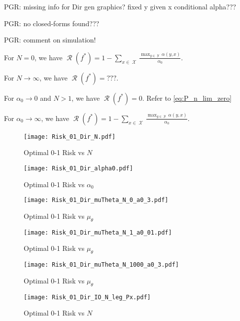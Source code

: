 \documentclass[12pt]{report}
\DeclareMathOperator{\Xcal}{\mathcal{X}}
\DeclareMathOperator{\Ycal}{\mathcal{Y}}
\DeclareMathOperator{\Rcal}{\mathcal{R}}
\begin{document}
PGR: missing info for Dir gen graphics? fixed y given x conditional alpha???

PGR: no closed-forms found???


PGR: comment on simulation!

For $N = 0$, we have $\Rcal(f^*) = 1 - \sum_{x \in \Xcal} \frac{\max_{y \in \Ycal} \alpha(y,x)}{\alpha_0}$. 

For $N \to \infty$, we have $\Rcal(f^*) = ???$.

For $\alpha_0 \to 0$ and $N > 1$, we have $\Rcal(f^*) = 0$. Refer to \ref{eq:P_n_lim_zero}

For $\alpha_0 \to \infty$, we have $\Rcal(f^*) = 1 - \sum_{x \in \Xcal} \frac{\max_{y \in \Ycal} \alpha(y,x)}{\alpha_0}$.



\begin{figure}
\centering
\texttt{[image: Risk\_01\_Dir\_N.pdf]}
\caption{Optimal 0-1 Risk vs $N$}
\label{fig:Risk_01_Dir_N}
\end{figure}

\begin{figure}
\centering
\texttt{[image: Risk\_01\_Dir\_alpha0.pdf]}
\caption{Optimal 0-1 Risk vs $\alpha_0$}
\label{fig:Risk_01_Dir_alpha0}
\end{figure}

\begin{figure}
\centering
\texttt{[image: Risk\_01\_Dir\_muTheta\_N\_0\_a0\_3.pdf]}
\caption{Optimal 0-1 Risk vs $\mu_{\theta}$}
\label{fig:Risk_01_Dir_muTheta_N_0_a0_3}
\end{figure}

\begin{figure}
\centering
\texttt{[image: Risk\_01\_Dir\_muTheta\_N\_1\_a0\_01.pdf]}
\caption{Optimal 0-1 Risk vs $\mu_{\theta}$}
\label{fig:Risk_01_Dir_muTheta_N_1_a0_01}
\end{figure}

\begin{figure}
\centering
\texttt{[image: Risk\_01\_Dir\_muTheta\_N\_1000\_a0\_3.pdf]}
\caption{Optimal 0-1 Risk vs $\mu_{\theta}$}
\label{fig:Risk_01_Dir_muTheta_N_1000_a0_3}
\end{figure}


\begin{figure}
\centering
\texttt{[image: Risk\_01\_Dir\_IO\_N\_leg\_Px.pdf]}
\caption{Optimal 0-1 Risk vs $N$}
\label{fig:Risk_01_Dir_IO_N_leg_Px}
\end{figure}
\end{document}
